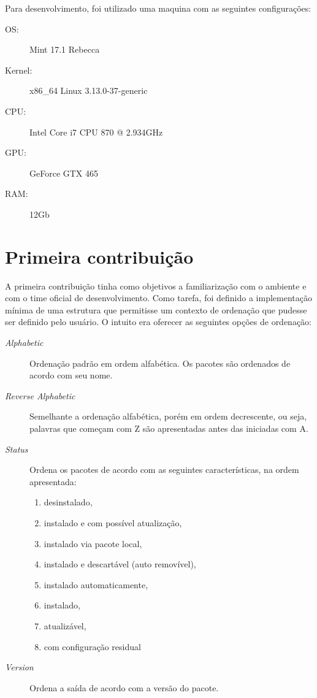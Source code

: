 Para desenvolvimento, foi utilizado uma maquina com as seguintes configurações:


\begin{description}
	\item[OS:] Mint 17.1 Rebecca
	\item[Kernel:] x86\_64 Linux 3.13.0-37-generic
	\item[CPU:] Intel Core i7 CPU 870 @ 2.934GHz
	\item[GPU:] GeForce GTX 465
	\item[RAM:] 12Gb
\end{description}


\section{Primeira contribuição} %
\label{sec:primeira_contribui_o}

A primeira contribuição tinha como objetivos a familiarização com o ambiente e com o time oficial de desenvolvimento. Como tarefa, foi definido a implementação mínima de uma estrutura que permitisse um contexto de ordenação que pudesse ser definido pelo usuário. O intuito era oferecer as seguintes opções de ordenação:

\begin{description}
	\item [\textit{Alphabetic}] Ordenação padrão em ordem alfabética. Os pacotes são ordenados de acordo com seu nome.
	\item [\textit{Reverse Alphabetic}] Semelhante a ordenação alfabética, porém em ordem decrescente, ou seja, palavras que começam com {\code Z} são apresentadas antes das iniciadas com {\code A}.
	\item [\textit{Status}] Ordena os pacotes de acordo com as seguintes características, na ordem apresentada:
	\begin{enumerate}
		\item desinstalado,
		\item instalado e com possível atualização,
		\item instalado via pacote local,
		\item instalado e descartável (auto removível),
		\item instalado automaticamente,
		\item instalado,
		\item atualizável,
		\item com configuração residual
	\end{enumerate}
	\item [\textit{Version}] Ordena a saída de acordo com a versão do pacote.
\end{description}

